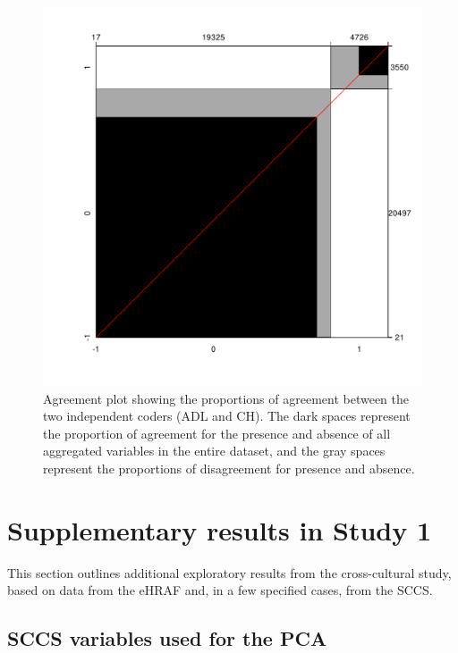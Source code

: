 \documentclass[
]{article}
\begin{document}
\begin{figure}
\centering
\includegraphics{supplementary_files/figure-latex/agreeplot-1.pdf}
\caption{\label{fig:agreeplot}Agreement plot showing the proportions of agreement between the two independent coders (ADL and CH). The dark spaces represent the proportion of agreement for the presence and absence of all aggregated variables in the entire dataset, and the gray spaces represent the proportions of disagreement for presence and absence.}
\end{figure}

\hypertarget{supplementary-results-in-study-1}{%
\section{Supplementary results in Study 1}\label{supplementary-results-in-study-1}}

This section outlines additional exploratory results from the cross-cultural study, based on data from the eHRAF and, in a few specified cases, from the SCCS.

\hypertarget{sccs-variables-used-for-the-pca}{%
\subsection{SCCS variables used for the PCA}\label{sccs-variables-used-for-the-pca}}
\end{document}
